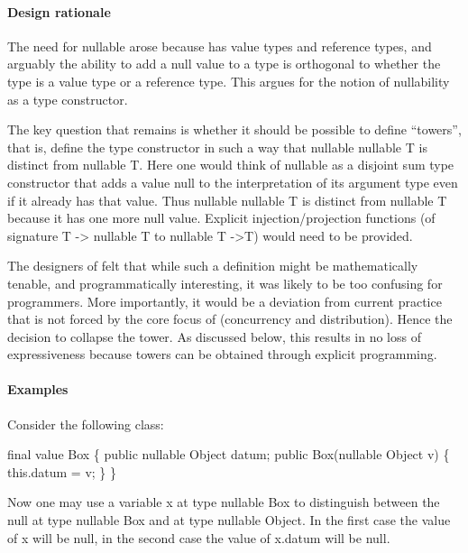 \paragraph{Design rationale}

The need for {\cf nullable} arose because \Xten{} has value types and
reference types, and arguably the ability to add a {\cf null} value to
a type is orthogonal to whether the type is a value type or a
reference type. This argues for the notion of nullability as a type
constructor.

The key question that remains is whether it should be possible to
define ``towers'', that is, define the type constructor in such a way
that {\cf nullable nullable T} is distinct from {\cf nullable T}. Here
one would think of nullable as a disjoint sum type constructor that
adds a value {\cf null} to the interpretation of its argument type
even if it already has that value. Thus {\cf nullable nullable T} is
distinct from {\cf nullable T} because it has one more {\cf null}
value. Explicit injection/projection functions (of signature {\cf T ->
nullable T} to {\cf nullable T ->T}) would need to be provided.

The designers of \Xten{} felt that while such a definition might be
mathematically tenable, and programmatically interesting, it was
likely to be too confusing for programmers. More importantly, it would
be a deviation from current practice that is not forced by the core
focus of \Xten{} (concurrency and distribution). Hence the decision to
collapse the tower.  As discussed below, this results in no loss of
expressiveness because towers can be obtained through explicit
programming.

\paragraph{Examples}

Consider the following class:

\begin{x10}
final value Box \{ 
  public nullable Object datum; 
  public Box(nullable Object v) \{ this.datum = v; \}
\}
\end{x10}

Now one may use a variable {\cf x} at type {\cf nullable Box} to
distinguish between the {\cf null} at type {\cf nullable Box} and at type
{\cf nullable Object}. In the first case the value
of {\cf x} will be {\cf null}, in the second case the value of {\cf x.datum} will
be {\cf null}.

